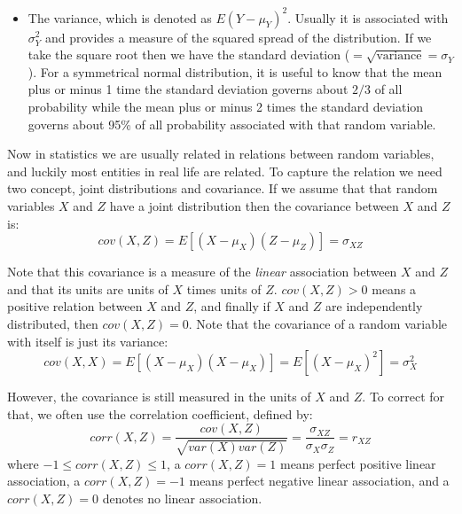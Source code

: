 \documentclass[
]{book}
\providecommand{\tightlist}{%
  \setlength{\itemsep}{0pt}\setlength{\parskip}{0pt}}
\begin{document}
\begin{itemize}
\tightlist
\item
  The variance, which is denoted as \(E(Y - \mu_Y)^2\). Usually it is associated with \(\sigma^2_Y\) and provides a measure of the squared spread of the distribution. If we take the square root then we have the standard deviation (\(=\sqrt{\text{variance}} = \sigma_Y\)). For a symmetrical normal distribution, it is useful to know that the mean plus or minus 1 time the standard deviation governs about \(2/3\) of all probability while the mean plus or minus 2 times the standard deviation governs about 95\% of all probability associated with that random variable.
\end{itemize}

Now in statistics we are usually related in relations between random variables, and luckily most entities in real life are related. To capture the relation we need two concept, joint distributions and covariance. If we assume that that random variables \(X\) and \(Z\) have a joint distribution then the covariance between \(X\) and \(Z\) is:
\begin{equation}
cov(X,Z) = E[(X- \mu_X)(Z- \mu_Z)] = \sigma_{XZ}
\end{equation}

Note that this covariance is a measure of the \emph{linear} association between \(X\) and \(Z\) and that its units are units of \(X\) times units of \(Z\). \(cov(X,Z) > 0\) means a positive relation between \(X\) and \(Z\), and finally if \(X\) and \(Z\) are independently distributed, then \(cov(X,Z) = 0\). Note that the covariance of a random variable with itself is just its variance:
\begin{equation}
cov(X,X) = E[(X-\mu_X)(X - \mu_X)] = E[(X - \mu_X)^2] = \sigma^2_X
\end{equation}

However, the covariance is still measured in the units of \(X\) and \(Z\). To correct for that, we often use the correlation coefficient, defined by:
\begin{equation}
corr(X,Z) = \frac{cov(X,Z)}{\sqrt{var(X)var(Z)}} = \frac{\sigma_{XZ}}{\sigma{_X}\sigma{_Z}} = r_{XZ}
\end{equation}
where \(-1 \leq corr(X,Z) \leq 1\), a \(corr(X,Z) = 1\) means perfect positive linear association, a \(corr(X,Z) = -1\) means perfect negative linear association, and a \(corr(X,Z) = 0\) denotes no linear association.
\end{document}
